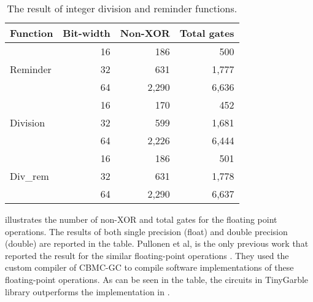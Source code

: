 \begin{table}[]
\center
\caption{The result of integer division and reminder functions.}\label{table:div}
\begin{tabular}{l||r||r|r}
	Function                  & \multicolumn{1}{c|}{Bit-width} & \multicolumn{1}{c|}{Non-XOR} & \multicolumn{1}{c}{Total gates} \\ \hline \hline
\multirow{3}{*}{Reminder} & 16        & 186     & 500         \\
                          & 32        & 631     & 1,777       \\
                          & 64        & 2,290   & 6,636       \\ \hline \hline
\multirow{3}{*}{Division} & 16        & 170     & 452         \\
                          & 32        & 599     & 1,681       \\
                          & 64        & 2,226   & 6,444       \\ \hline \hline
\multirow{3}{*}{Div\_rem} & 16        & 186     & 501         \\
                          & 32        & 631     & 1,778       \\
                          & 64        & 2,290   & 6,637
\end{tabular}
\end{table}

 illustrates the number of non-XOR and total gates for the floating point operations.
The results of both single precision (float) and double precision (double) are reported in the table.
Pullonen et al, is the only previous work that reported the result for the similar floating-point operations \cite{pullonen2015combining}.
They used the custom compiler of CBMC-GC \cite{franz2014cbmc} to compile software implementations of these floating-point operations.
As can be seen in the table, the circuits in TinyGarble library outperforms the implementation in \cite{pullonen2015combining}.

